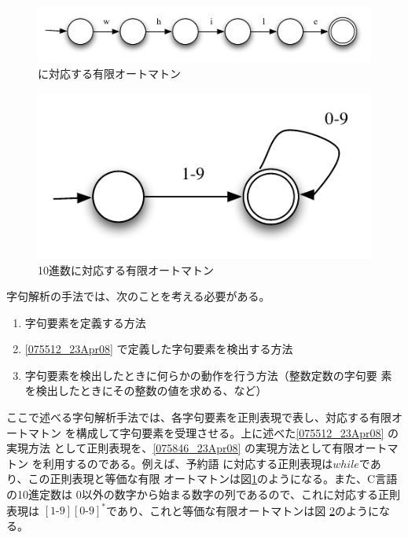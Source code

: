 \begin{figure}
 \begin{center}
  \includegraphics[width=13cm]{figure/fa_while.pdf}
 \end{center}
 \caption{に対応する有限オートマトン}
 \label{163948_18Apr06}
\end{figure}
\begin{figure}
 \begin{center}
  \includegraphics{figure/fa_decimal.pdf}
 \end{center}
 \caption{10進数に対応する有限オートマトン}
 \label{164232_18Apr06}
\end{figure}

字句解析の手法では、次のことを考える必要がある。
\begin{enumerate}
 \item 字句要素を定義する方法
       \label{075512_23Apr08}
 \item \ref{075512_23Apr08} で定義した字句要素を検出する方法
       \label{075846_23Apr08}
 \item 字句要素を検出したときに何らかの動作を行う方法（整数定数の字句要
       素を検出したときにその整数の値を求める、など）
\end{enumerate}

ここで述べる字句解析手法では、各字句要素を正則表現で表し、対応する有限オートマトン
を構成して字句要素を受理させる。上に述べた\ref{075512_23Apr08} の実現方法
として正則表現を、\ref{075846_23Apr08} の実現方法として有限オートマトン
を利用するのである。例えば、予約語
に対応する正則表現は$while$であり、この正則表現と等価な有限
オートマトンは図\ref{163948_18Apr06}のようになる。また、C言語の10進定数は
0以外の数字から始まる数字の列であるので、これに対応する正則表現は
$[1\mbox{-}9][0\mbox{-}9]^\ast$であり、これと等価な有限オートマトンは図
\ref{164232_18Apr06}のようになる。

